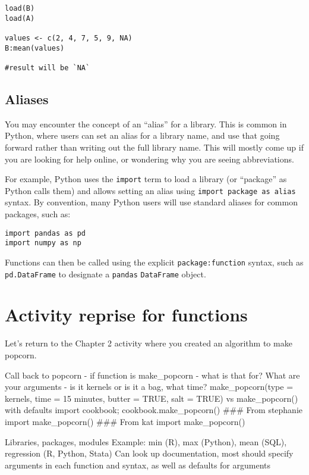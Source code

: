 \documentclass[
]{book}
\begin{document}
\begin{verbatim}
load(B)
load(A)

values <- c(2, 4, 7, 5, 9, NA)
B:mean(values)

#result will be `NA`
\end{verbatim}

\subsection{Aliases}\label{aliases}

You may encounter the concept of an ``alias'' for a library. This is common in Python, where users can set an alias for a library name, and use that going forward rather than writing out the full library name. This will mostly come up if you are looking for help online, or wondering why you are seeing abbreviations.

For example, Python uses the \texttt{import} term to load a library (or ``package'' as Python calls them) and allows setting an alias using \texttt{import\ package\ as\ alias} syntax. By convention, many Python users will use standard aliases for common packages, such as:

\begin{verbatim}
import pandas as pd
import numpy as np
\end{verbatim}

Functions can then be called using the explicit \texttt{package:function} syntax, such as \texttt{pd.DataFrame} to designate a \texttt{pandas} \texttt{DataFrame} object.

\section{Activity reprise for functions}\label{activity-reprise-for-functions}

Let's return to the Chapter 2 activity where you created an algorithm to make popcorn.

Call back to popcorn - if function is make\_popcorn - what is that for? What are your arguments - is it kernels or is it a bag, what time?
make\_popcorn(type = kernels, time = 15 minutes, butter = TRUE, salt = TRUE) vs make\_popcorn() with defaults
import cookbook; cookbook.make\_popcorn()
\#\#\# From stephanie import make\_popcorn()
\#\#\# From kat import make\_popcorn()

Libraries, packages, modules
Example: min (R), max (Python), mean (SQL), regression (R, Python, Stata)
Can look up documentation, most should specify arguments in each function and syntax, as well as defaults for arguments
\end{document}
